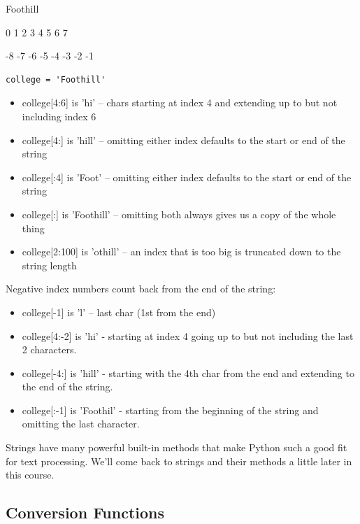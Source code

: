 \documentclass{article}
\begin{document}
 Foothill

 0 1 2 3 4 5 6 7

-8 -7 -6 -5 -4 -3 -2 -1

\begin{lstlisting}
college = 'Foothill'
\end{lstlisting}
\begin{itemize}

\item college[4:6] is 'hi' -- chars starting at index 4 and extending up to but not including index 6

\item college[4:] is 'hill' -- omitting either index defaults to the start or end of the string

\item college[:4] is 'Foot' -- omitting either index defaults to the start or end of the string

\item college[:] is 'Foothill' -- omitting both always gives us a copy of the whole thing

\item college[2:100] is 'othill' -- an index that is too big is truncated down to the string length
\end{itemize}

Negative index numbers count back from the end of the string:
\begin{itemize}


\item college[-1] is 'l' -- last char (1st from the end)

\item college[4:-2] is 'hi' - starting at index 4 going up to but not including the last 2 characters.

\item college[-4:] is 'hill' - starting with the 4th  char from the end and extending to the end of the string.

\item college[:-1] is 'Foothil' - starting from the beginning of the string and omitting the last character.
\end{itemize}

Strings have many powerful built-in methods that make Python such a good fit for text processing. We'll come back to strings  and their methods a little later in this course. 

\subsection{Conversion Functions}
\end{document}
